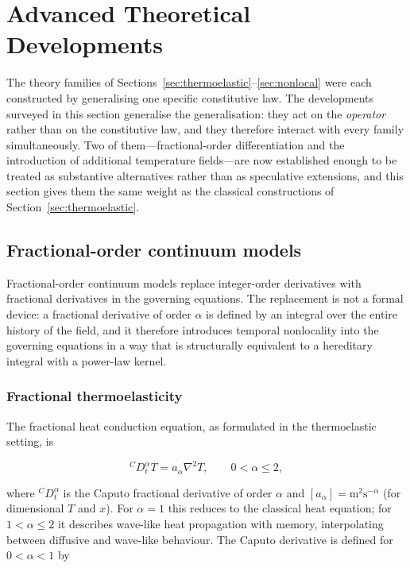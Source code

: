 \section{Advanced Theoretical Developments}
\label{sec:advanced}

The theory families of Sections~\ref{sec:thermoelastic}--\ref{sec:nonlocal} were each constructed by generalising one specific constitutive law. The developments surveyed in this section generalise the generalisation: they act on the \emph{operator} rather than on the constitutive law, and they therefore interact with every family simultaneously. Two of them---fractional-order differentiation and the introduction of additional temperature fields---are now established enough to be treated as substantive alternatives rather than as speculative extensions, and this section gives them the same weight as the classical constructions of Section~\ref{sec:thermoelastic}.

\subsection{Fractional-order continuum models}
\label{sec:11.1}

Fractional-order continuum models replace integer-order derivatives with fractional derivatives in the governing equations. The replacement is not a formal device: a fractional derivative of order $\alpha$ is defined by an integral over the entire history of the field, and it therefore introduces temporal nonlocality into the governing equations in a way that is structurally equivalent to a hereditary integral with a power-law kernel.

\subsubsection{Fractional thermoelasticity}

The fractional heat conduction equation, as formulated in the thermoelastic setting, is

\begin{equation}
{}^C D_t^\alpha T = a_\alpha\nabla^2 T, \qquad 0 < \alpha \leq 2,
\label{eq:11.1}
\end{equation}

where ${}^C D_t^\alpha$ is the Caputo fractional derivative of order $\alpha$ and $[a_\alpha]=\mathrm{m^2 s^{-\alpha}}$ (for dimensional $T$ and $x$). For $\alpha = 1$ this reduces to the classical heat equation; for $1 < \alpha \leq 2$ it describes wave-like heat propagation with memory, interpolating between diffusive and wave-like behaviour. The Caputo derivative is defined for $0 < \alpha < 1$ by

